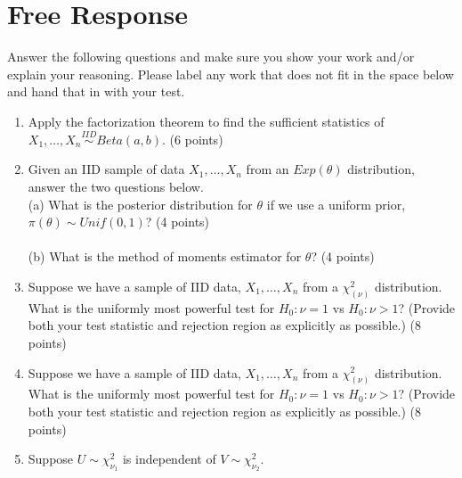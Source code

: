 \documentclass[12pt]{article}
\begin{document}
\section{Free Response}
Answer the following questions and make sure you show your work and/or explain your reasoning. Please label any work that does not fit in the space below and hand that in with your test. 
\begin{enumerate}[leftmargin=\labelsep]
\item Apply the factorization theorem to find the sufficient statistics of $X_1, \dots, X_n \stackrel{IID}{\sim} Beta(a, b)$. (6 points)
\pagebreak 

\item Given an IID sample of data $X_1, \dots, X_n$ from an $Exp(\theta)$ distribution, answer the two questions below.\\

(a) What is the posterior distribution for $\theta$ if we use a uniform prior, $\pi(\theta) \sim Unif(0,1)$? (4 points)\\
\vspace{5in}\\
(b) What is the method of moments estimator for $\theta$? (4 points)\\
\pagebreak 


\item Suppose we have a sample of IID data, $X_1, \dots, X_n$ from a $\chi^2_{(\nu)}$ distribution. What is the uniformly most powerful test for $H_0: \nu = 1$ vs $H_0: \nu >1$? (Provide both your test statistic and rejection region as explicitly as possible.) (8 points)\\
\pagebreak 

\item Suppose we have a sample of IID data, $X_1, \dots, X_n$ from a $\chi^2_{(\nu)}$ distribution. What is the uniformly most powerful test for $H_0: \nu = 1$ vs $H_0: \nu >1$? (Provide both your test statistic and rejection region as explicitly as possible.) (8 points)\\
\pagebreak 

\item Suppose $U \sim \chi^2_{\nu_1}$ is independent of $V \sim \chi^2_{\nu_2}$.\\


\end{enumerate}
\end{document}
